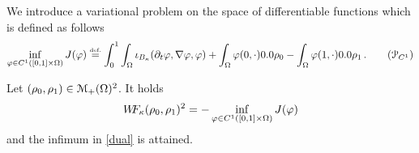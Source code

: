 \begin{definition} We introduce a variational problem on the space of differentiable functions which is defined as follows
\begin{equation*}
\label{primal}
\inf_{\varphi \in C^1([0,1] \times \Om)} J(\varphi) \defeq \int_0^1 \int_{\Om} \iota_{B_{\kappa}}(\D_t \varphi, \nabla \varphi, \varphi) + \int_{\Om} \varphi(0,\cdot)\d\rho_0 - \int_{\Om} \varphi(1,\cdot) \d\rho_1 \, .
\tag{$\mathcal{P}_{C^1}$}
\end{equation*}
\end{definition}
%
\begin{theorem}
Let $(\rho_0,\rho_1)\in\mathcal{M}_+(\Omega)^2$. It holds
\[
W\! \! F_{\kappa}(\rho_0,\rho_1)^2 = -\inf_{\varphi \in C^1([0,1] \times \Omega)} J(\varphi)
\] 
and the infimum in \eqref{dual} is attained.
\end{theorem}

